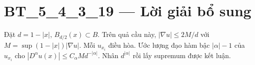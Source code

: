 \documentclass[10pt,a4paper]{article}
\begin{document}
\section*{BT\_5\_4\_3\_19 — Lời giải bổ sung}
Đặt $d=1-|x|$, $B_{d/2}(x)\subset B$. Trên quả cầu này, $|\nabla u|\le2M/d$ với $M=\sup(1-|x|)|\nabla u|$. Mỗi $u_{x_i}$ điều hòa. Ước lượng đạo hàm bậc $|\alpha|-1$ của $u_{x_i}$ cho $|D^\alpha u(x)|\le C_\alpha M d^{-|\alpha|}$. Nhân $d^{|\alpha|}$ rồi lấy supremum được kết luận.
\end{document}
